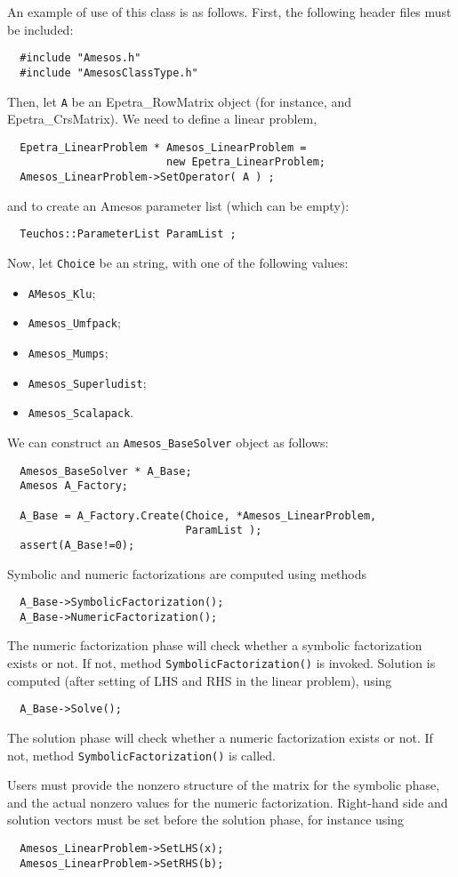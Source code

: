 An example of use of this class is as follows. First, the following
header files must be included:
\begin{verbatim}
  #include "Amesos.h" 
  #include "AmesosClassType.h"
\end{verbatim}
Then, let \verb!A! be an Epetra\_RowMatrix object (for instance, and
Epetra\_CrsMatrix). We need to define a linear problem,
\begin{verbatim}
  Epetra_LinearProblem * Amesos_LinearProblem = 
                         new Epetra_LinearProblem;
  Amesos_LinearProblem->SetOperator( A ) ; 
\end{verbatim}
and to create an Amesos parameter list (which can be empty):
\begin{verbatim}
  Teuchos::ParameterList ParamList ;
\end{verbatim}
Now, let \verb!Choice! be an string, with one of the
following values: 
\begin{itemize}
\item {\tt AMesos\_Klu};
\item {\tt Amesos\_Umfpack};
\item {\tt Amesos\_Mumps};
\item {\tt Amesos\_Superludist};
\item {\tt Amesos\_Scalapack}.
\end{itemize}
We can construct an \verb!Amesos_BaseSolver! object as follows:
\begin{verbatim}
  Amesos_BaseSolver * A_Base;
  Amesos A_Factory;

  A_Base = A_Factory.Create(Choice, *Amesos_LinearProblem, 
                            ParamList );
  assert(A_Base!=0);
\end{verbatim}
Symbolic and numeric factorizations are computed using methods
\begin{verbatim}
  A_Base->SymbolicFactorization();
  A_Base->NumericFactorization();
\end{verbatim}
The numeric factorization phase will check whether a symbolic
factorization exists or not. If not, method
\verb!SymbolicFactorization()! is invoked.  Solution is computed (after
setting of LHS and RHS in the linear problem), using
\begin{verbatim}
  A_Base->Solve();
\end{verbatim}
The solution phase will check whether a numeric factorization exists or
not. If not, method \verb!SymbolicFactorization()! is called.

Users must provide the nonzero structure of the matrix for the symbolic
phase, and the actual nonzero values for the numeric
factorization. Right-hand side and solution vectors must be set before
the solution phase, for instance using
\begin{verbatim}
  Amesos_LinearProblem->SetLHS(x);
  Amesos_LinearProblem->SetRHS(b);
\end{verbatim}

